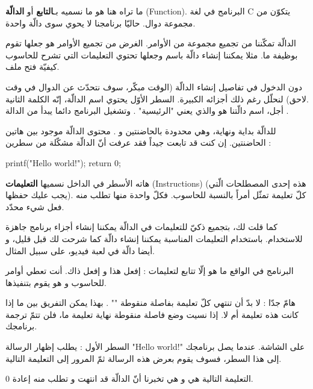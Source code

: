 ما تراه هنا هو ما نسميه بـ\textbf{التابع}
أو
\textbf{الدالّة}
(\textenglish{Function}).
 البرنامج في لغة
\textenglish{C}
 يتكوّن من مجموعة دوال. حاليّا برنامجنا لا يحوي سوى دالّة واحدة.

الدالّة تمكّننا من تجميع مجموعة من الأوامر. الغرض من تجميع الأوامر هو جعلها تقوم بوظيفة ما. مثلا يمكننا إنشاء دالّة باسم
 وجعلها تحتوي التعليمات التي تشرح للحاسوب كيفيّة فتح ملف.

 دون الدخول في تفاصيل إنشاء الدالّة (الوقت مبكّر، سوف نتحدّث عن الدوال في وقت لاحق) لنحلّل رغم ذلك أجزائه الكبيرة. السطر الأوّل يحتوي اسم الدالّة، إنّه الكلمة الثانية.\\
 أجل، اسم دالّتنا هو
والذي يعني
"الرئيسية"
. وتشغيل البرنامج دائما يبدأ من الدالة
.

للدالّة بداية ونهاية، وهي محدودة بالحاضنتين
\InlineCode{\{}
و
\InlineCode{\}}.
محتوى الدالّة موجود بين هاتين الحاضنتين. إن كنت قد تابعت جيداً فقد عرفت أنّ الدالّة مشكّلة من سطرين :

\begin{Csource}
printf("Hello world!\n");
return 0;
\end{Csource}

هاته الأسطر في الداخل نسميها
\textbf{التعليمات}
(\textenglish{Instructions})
 (هذه إحدى المصطلحات الّتي يجب عليك حفظها). كلّ تعليمة تمثّل أمراً بالنسبة للحاسوب. فكلّ واحدة منها تطلب منه فعل شيء محدّد.

 كما قلت لك، بتجميع ذكيّ للتعليمات في الدالّة يمكننا إنشاء أجزاء برنامج جاهزة للاستخدام. باستخدام التعليمات المناسبة يمكننا إنشاء دالّة
 كما شرحت لك قبل قليل، و أيضا دالّة
 في لعبة فيديو، على سبيل المثال.

 البرنامج في الواقع ما هو إلّا تتابع لتعليمات : إفعل هذا و إفعل ذاك. أنت تعطي أوامر للحاسوب و هو يقوم بتنفيذها.

 \begin{critical}
هامّ جدّا : لا بدّ أن تنتهي كلّ تعليمة بفاصلة منقوطة
"\InlineCode{;}"
. بهذا يمكن التفريق بين ما إذا كانت هذه تعليمة أم لا. إذا نسيت وضع فاصلة منقوطة نهاية تعليمة ما، فلن تتمّ ترجمة برنامجك.
 \end{critical}

 السطر الأول :
 يطلب إظهار الرسالة
 "\textenglish{Hello world!}"
  على الشاشة. عندما يصل برنامجك إلى هذا السطر، فسوف يقوم بعرض هذه الرسالة ثمّ المرور إلى التعليمة التالية.

  التعليمة التالية هي
 و هي تخبرنا أنّ الدالّة
 قد انتهت و تطلب منه إعادة 0.

